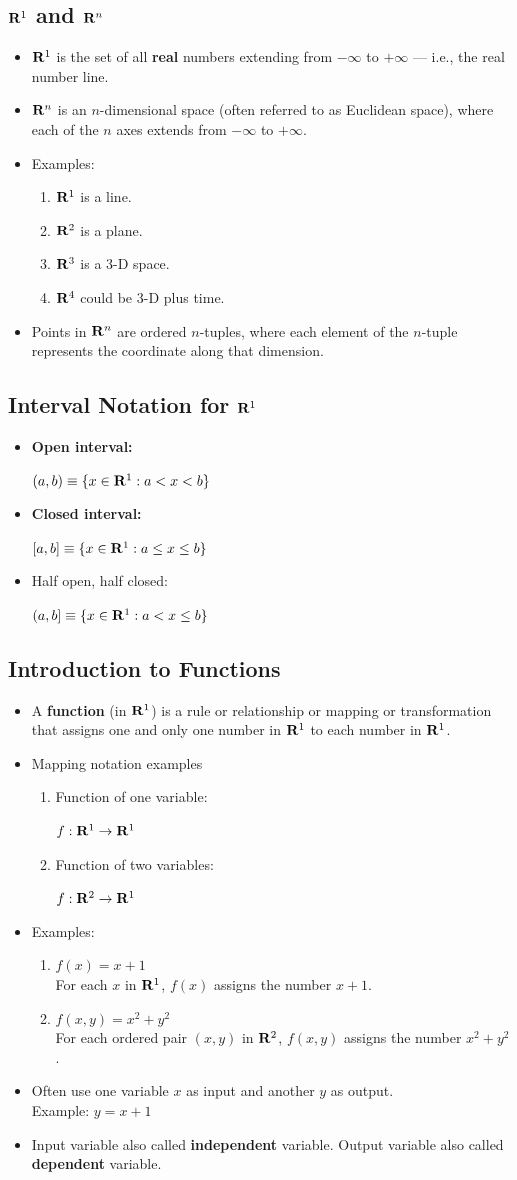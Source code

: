 \documentclass[20pt]{extarticle}
\newcommand{\bi}{\begin{itemize}}
\newcommand{\ei}{\end{itemize}}
\newcommand{\be}{\begin{enumerate}}
\newcommand{\ee}{\end{enumerate}}
\newcommand{\ro}{{\bf R}^1 }
\newcommand{\pbt}{\parbox{2in}}
\begin{document}
\subsection{$\ro$ and ${\bf R}^n$}
\bi
\item $\ro$ is the set of all {\bf real} numbers extending from
$-\infty$ to $+\infty$ --- i.e., the real number line.
\item ${\bf R}^n$ is an $n$-dimensional space (often referred to as Euclidean
space), where each of the $n$ axes extends from $-\infty$ to $+\infty$.
\item Examples:
  \be
  \item $\ro$ is a line.
  \item ${\bf R}^2$ is a plane.
  \item ${\bf R}^3$ is a 3-D space.
  \item ${\bf R}^4$ could be 3-D plus time.
  \ee
\item Points in ${\bf R}^n$ are ordered $n$-tuples, where each element
of the $n$-tuple represents the coordinate along that dimension.
\ei


\subsection{Interval Notation for $\ro$}
\bi
\item \pbt{\bf Open interval:} $(a,b)\equiv \{ x\in\ro: a<x<b\}$
\item \pbt{\bf Closed interval:} $[a,b]\equiv \{ x\in\ro: a\le x \le b\}$
\item \pbt{Half open, half closed:} $(a,b]\equiv \{ x\in\ro: a<x\le b\}$
\ei

\subsection{Introduction to Functions}
\bi
\item A {\bf function} (in $\ro$) is a rule or relationship or mapping
or transformation that assigns one and only one number in $\ro$ to each
number in $\ro$.
\item Mapping notation examples
  \be
  \item \pbt{Function of one variable:} $f:\ro\to\ro$
  \item \pbt{Function of two variables:} $f: {\bf R}^2\to\ro$
  \ee
\item Examples:
  \be
  \item $f(x)=x+1$\\
        For each $x$ in $\ro$, $f(x)$ assigns the number $x+1$.
  \item $f(x,y)=x^2+y^2$\\
        For each ordered pair $(x,y)$ in ${\bf R}^2$, $f(x,y)$ assigns
the number $x^2+y^2$.
  \ee
\item Often use one variable $x$ as input and another $y$ as output.\\
Example: $y=x+1$
\item Input variable also called {\bf independent} variable.
Output variable also called {\bf dependent} variable.
\ei
\end{document}
